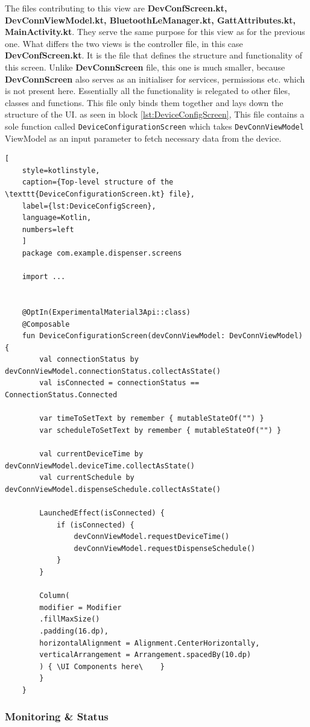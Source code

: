 The files contributing to this view are \textbf{DevConfScreen.kt, DevConnViewModel.kt, BluetoothLeManager.kt, GattAttributes.kt, MainActivity.kt}. They serve the same purpose for this view as for the previous one. What differs the two views is the controller file, in this case \textbf{DevConfScreen.kt}. It is the file that defines the structure and functionality of this screen. Unlike \textbf{DevConnScreen} file, this one is much smaller, because \textbf{DevConnScreen} also serves as an initialiser for services, permissions etc. which is not present here. Essentially all the functionality is relegated to other files, classes and functions. This file only binds them together and lays down the structure of the \ac{UI}. as seen in block \ref{lst:DeviceConfigScreen}, This file contains a sole function called \texttt{DeviceConfigurationScreen} which takes \texttt{DevConnViewModel} ViewModel as an input parameter to fetch necessary data from the device.
\newpage
\begin{lstlisting}[
	style=kotlinstyle,
	caption={Top-level structure of the \texttt{DeviceConfigurationScreen.kt} file},
	label={lst:DeviceConfigScreen},
	language=Kotlin,
	numbers=left
	]
	package com.example.dispenser.screens
	
	import ...

	
	@OptIn(ExperimentalMaterial3Api::class)
	@Composable
	fun DeviceConfigurationScreen(devConnViewModel: DevConnViewModel) {
		val connectionStatus by devConnViewModel.connectionStatus.collectAsState()
		val isConnected = connectionStatus == ConnectionStatus.Connected
		
		var timeToSetText by remember { mutableStateOf("") }
		var scheduleToSetText by remember { mutableStateOf("") }
		
		val currentDeviceTime by devConnViewModel.deviceTime.collectAsState()
		val currentSchedule by devConnViewModel.dispenseSchedule.collectAsState()
		
		LaunchedEffect(isConnected) {
			if (isConnected) {
				devConnViewModel.requestDeviceTime()
				devConnViewModel.requestDispenseSchedule()
			}
		}
		
		Column(
		modifier = Modifier
		.fillMaxSize()
		.padding(16.dp),
		horizontalAlignment = Alignment.CenterHorizontally,
		verticalArrangement = Arrangement.spacedBy(10.dp)
		) { \UI Components here\	}
		}
	}
\end{lstlisting}

\subsubsection{Monitoring \&  Status}

